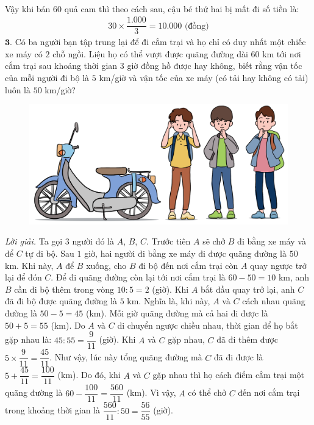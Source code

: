 \begin{multicols}{2}
\begin{align*}
	\end{align*}
	Vậy khi bán $60$ quả cam thì theo cách sau, cậu bé thứ hai bị mất đi số tiền là:
	\begin{align*}
		30\times \dfrac{1{.}000}{3} = 10{.}000 \text{ (đồng)}
	\end{align*}
	$\pmb{3.}$ Có ba người bạn tập trung lại để đi cắm trại và họ chỉ có duy nhất một chiếc xe máy có $2$ chỗ ngồi. Liệu họ có thể vượt được quãng đường dài $60$ km tới nơi cắm trại sau khoảng thời gian $3$ giờ đồng hồ được hay không, biết rằng vận tốc của mỗi người đi bộ là $5$ km/giờ và vận tốc của xe máy (có tải hay không có tải) luôn là $50$ km/giờ?
	\begin{figure}[H]
		\centering
		\vspace*{-15pt}
		\captionsetup{labelformat= empty, justification=centering}
		\includegraphics[width=1\linewidth]{Pi10_ToanBi_Bai3}
		\vspace*{-15pt}
	\end{figure}
	\textit{Lời giải.} 	Ta gọi $3$ người đó là $A$, $B$, $C$. Trước tiên $A$ sẽ chở $B$ đi bằng xe máy và để $C$ tự đi bộ. Sau $1$ giờ, hai người đi bằng xe máy đi được quãng đường là $50$ km. Khi này, $A$ để $B$ xuống, cho $B$ đi bộ đến nơi cắm trại còn $A$ quay ngược trở lại để đón $C$. Để đi quãng đường còn lại tới nơi cắm trại là $60-50=10$ km, anh $B$ cần đi bộ thêm trong vòng $10 : 5= 2$ (giờ). Khi $A$ bắt đầu quay trở lại, anh $C$ đã đi bộ được quãng đường là $5$ km. Nghĩa là, khi này, $A$ và $C$ cách nhau quãng đường là $50-5=45$ (km). Mỗi giờ quãng đường mà cả hai đi được là $50+5=55$ (km). Do $A$ và $C$ di chuyển ngược chiều nhau, thời gian để họ bắt gặp nhau là: $45: 55= \dfrac{9}{11} $ (giờ). Khi $A$ và $C$ gặp nhau, $C$ đã đi thêm được $5\times \dfrac{9}{11}= \dfrac{45}{11}$. Như vậy, lúc này tổng quãng đường mà $C$ đã đi được là
	$5 + \dfrac{45}{11}= \dfrac{100}{11}$ (km). Do đó, khi $A$ và $C$ gặp nhau thì họ cách điểm cắm trại một quãng đường là $60- \dfrac{100}{11}= \dfrac{560}{11}$ (km). Vì vậy, $A$ có thể chở $C$ đến nơi cắm trại trong khoảng thời gian là $\dfrac{560}{11}: 50= \dfrac{56}{55}$ (giờ).

\end{multicols}
